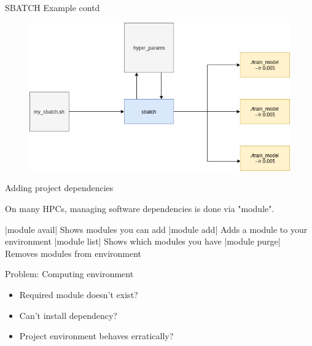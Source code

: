 \documentclass[10pt]{beamer}              %
\begin{document}
\begin{frame}{SBATCH Example contd}
    \begin{figure}[c]
    \includegraphics[scale=0.35]{media/images/workshop-diagrams-sbatch-2.png}
    \end{figure}
\end{frame}

\begin{frame}[fragile]{Adding project dependencies}

On many HPCs, managing software dependencies is done via "module". 

\begin{description}
    |module avail| Shows modules you can add
    |module add| Adds a module to your environment
    |module list| Shows which modules you have
    |module purge| Removes modules from environment
    
\end{description}
\end{frame}


\begin{frame}{Problem: Computing environment}

\begin{itemize}
    \item Required module doesn't exist?
    \item Can't install dependency?
    \item Project environment behaves erratically?
\end{itemize}
    
\end{frame}
\end{document}
